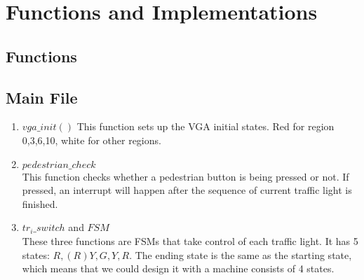\documentclass[a4paper,final]{scrartcl}
\numberwithin{equation}{section}		%
\numberwithin{figure}{section}			%
\numberwithin{table}{section}				%
\begin{document}
\section{Functions and Implementations}
\subsection{Functions}
\subsection{Main File}
	\begin{enumerate}
		\item \texttt{$vga\_init()$}
				This function sets up the VGA initial states. Red for region 0,3,6,10, white for other regions.
		
		\item \texttt{$pedestrian\_check$} \hfill \\
				This function checks whether a pedestrian button is being pressed or not. If pressed, an interrupt will happen after the sequence of current traffic light is finished.
		\item $tr_i\_switch$ and $FSM$ \hfill \\
				These three functions are FSMs that take control of each traffic light. It has 5 states: $R, (R)Y, G, Y, R$. 
				The ending state is the same as the starting state,
				which means that we could design it with a machine consists of 4 states.
				\begin{figure}[H] 
					\centering %
\end{figure}
\end{enumerate}
\end{document}
